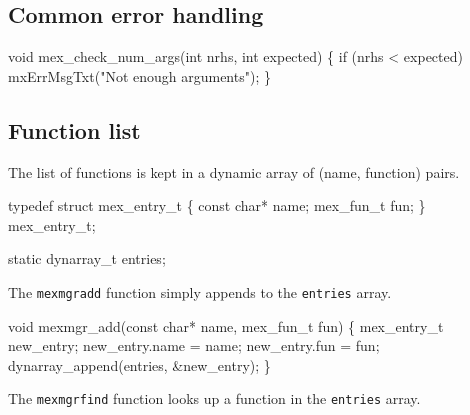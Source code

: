 \nwendcode{}\nwdocspar


\subsection{Common error handling}

\nwenddocs{}\plusendmoddef
void mex_check_num_args(int nrhs, int expected)
\{
    if (nrhs < expected)
        mxErrMsgTxt("Not enough arguments");
\}

\nwendcode{}\nwdocspar


\subsection{Function list}

The list of functions is kept in a dynamic array of
(name, function) pairs.

\nwenddocs{}\endmoddef
typedef struct mex_entry_t \{
    const char*  name;
    mex_fun_t    fun;
\} mex_entry_t;

\nwendcode{}\nwdocspar

\nwenddocs{}\endmoddef
static dynarray_t entries;

\nwendcode{}\nwdocspar

The {\tt{}mexmgr{}add} function simply appends to the {\tt{}entries} array.

\nwenddocs{}\plusendmoddef
void mexmgr_add(const char* name, mex_fun_t fun)
\{
    mex_entry_t new_entry;
    new_entry.name = name;
    new_entry.fun  = fun;
    dynarray_append(entries, &new_entry);
\}

\nwendcode{}\nwdocspar

The {\tt{}mexmgr{}find} function looks up a function in the {\tt{}entries}
array.

